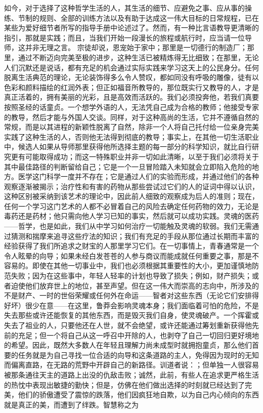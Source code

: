 如今，对于选择了这种哲学生活的人，其生活的细节、应避免之事、应从事的操练、节制的规则、全部的训练方法以及有助于达成这一伟大目标的日常规程，已在某些为爱好细节者所写的指导手册中论述过了。然而，有一种比言语教导更清晰的指引，那就是实践；而且，当我们开始一段漫长的旅程或航行时，应当请一位导师，这并非无理之言。 宗徒却说，恩宠始于家中；那里是一切德行的制造厂；那里，通过不断迈向完美至极的进步，这种生活已被精炼得无比细致；在那里，无论人们沉默还是说话，都有充足的机会通过实际实践来学习这天上的公民身分。任何脱离生活典范的理论，无论装饰得多么令人赞叹，都如同没有呼吸的雕像，徒有以色彩和颜料描绘的红润外表；但正如福音所教导的，那位既实行又教导的人，才是真正活着的，拥有美丽的光彩，且是高效而活跃的。我们必须投奔他，若我们真要按照圣经的话童贞。一个想学外语的人，无法凭自己成为合格的教师；他接受专家的教导，然后才能与外国人交谈。同样，对于这种高尚的生活，它并不遵循自然的常规，而是以其进程的新颖性脱离了自然，除非一个人将自己托付给一位亲身完美实践了这种生活的人，否则他无法得到彻底的教导；事实上，在其他一切生活职业中，候选人如果从导师那里获得他所选择主题的每一部分的科学知识，就比自行研究更有可能取得成功；而这一特殊职业并非一切如此清晰，以至于我们必须将关于其中最佳路径的判断留给自己；它是一个一旦冒险踏入未知就会立即陷入危险的地方。医学这门科学一度并不存在；它是通过人们的实验而形成，并通过他们的各种观察逐渐被揭示；治疗性和有害的药物从那些尝试过它们的人的证词中得以认识，这种区别被采纳到该艺术的理论中，因此前人细致的观察成为后人的准则；现在，任何一个学习这门艺术的人都不必冒着自己的风险去确定任何药物的效力，无论是毒药还是药材；他只需向他人学习已知的事实，然后就可以成功实践。灵魂的医药——哲学，也是如此，我们从中学习如何治疗一切能触及灵魂的软弱。我们无需通过猜测和揣摩来追寻这些疗法的知识；我们有充足的手段从那位通过长期而丰富的经验获得了我们所追求之财宝的人那里学习它们。在一切事情上，青春通常是一个令人眩晕的向导；如果未经白发苍苍的人参与商议而能成就任何重要之事，那是不容易的。即使在其他一切事业中，我们也必须根据其重要性的大小，更加谨慎地防范失败；因为在这些事中，年轻人轻率的计划也导致了损失；例如，财产损失；或者迫使他们放弃世上的地位，甚至声望。但在这一伟大而崇高的志向中，所涉及的不是财产、一时的世俗荣耀或任何外在命运——智者对这些东西（无论它们安排得好坏）很少在意——在这里，鲁莽会影响灵魂本身；我们面临着可怕的危险，不是失去那些或许还能恢复的其他东西，而是毁灭我们自身，使灵魂破产。一个挥霍或失去了祖业的人，只要他还在人世，就不会绝望，或许还能通过筹划重新获得他先前的充足；但一个将自己从这一呼召中开除的人，也剥夺了自己一切回归更好境地的希望。因此，既然大多数人在年轻且理解力尚未成型时就拥抱童贞，那么他们首要的任务就是为自己寻找一位合适的向导和这条道路的主人，免得因为现时的无知而偏离直路，在无路的荒野中开辟自己的新路径。训道者说：；但单独一人很容易被那条通往天主的道路上出没的仇敌击败；诚然，此前，有些人在追求更严格生活的热忱中表现出敏捷的勤快；但是，仿佛在他们做出选择的时刻就已经达到了完美，他们的骄傲遭受了震惊的跌落，他们因疯狂地自欺，以为自己内心倾向的东西就是真正的美，而遭到了绊跌。智慧称之为 